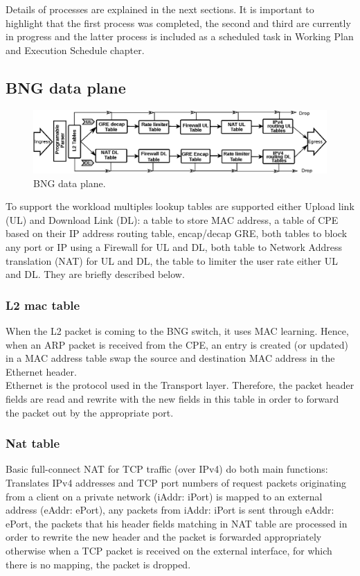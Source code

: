 Details of processes are explained in the next sections. It is important to highlight that the first process was completed, the second and third are currently in progress and the latter process is included as a scheduled task in Working Plan and Execution Schedule chapter.


\subsection{BNG data plane }
\label{ss:dataplane}
\begin{figure}[ht]
	\centering
	\includegraphics[width=0.8\linewidth] {eps/bng_pipeline.eps}
	\caption{BNG data plane.}
	\label{fig:bng_pipe}
\end{figure}

To support the workload multiples lookup tables are supported either Upload link (UL) and Download Link (DL): a table to store MAC address, a table of CPE based on their IP address routing table, encap/decap GRE, both tables to block any port or IP using a Firewall for UL and DL, both table to Network Address translation (NAT) for UL and DL, the table to limiter the user rate either UL and DL. They are briefly described below.

\subsubsection{L2 mac table}
When the L2 packet is coming to the BNG switch, it uses MAC learning. Hence, when an ARP packet is received from the CPE, an entry is created (or updated) in a MAC address table swap the source and destination MAC address in the Ethernet header.\\
Ethernet is the protocol used in the Transport layer.  Therefore, the packet header fields are read and rewrite with the new fields in this table in order to forward the packet out by the appropriate port.

\subsubsection{Nat table}
Basic full-connect NAT for TCP traffic (over IPv4) do both main functions:
Translates IPv4 addresses and TCP port numbers of request packets originating from a client on a private network (iAddr: iPort) is mapped to an external address (eAddr: ePort), any packets from iAddr: iPort is sent through eAddr: ePort, the packets that his header fields matching in NAT table are processed in order to rewrite the new header and the packet is forwarded appropriately otherwise when a TCP packet is received on the external interface, for which there is no mapping, the packet is dropped.


